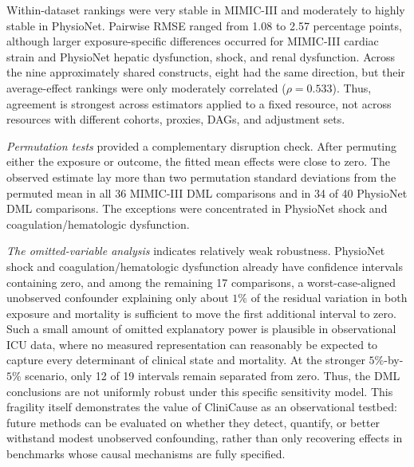 \documentclass[letterpaper]{article}
\begin{document}
Within-dataset rankings were very stable in MIMIC-III and moderately to highly
stable in PhysioNet. Pairwise RMSE ranged from 1.08 to 2.57 percentage points,
although larger exposure-specific differences occurred for MIMIC-III cardiac
strain and PhysioNet hepatic dysfunction, shock, and renal dysfunction. Across
the nine approximately shared constructs, eight had the same direction, but
their average-effect rankings were only moderately correlated
(\(\rho=0.533\)). Thus, agreement is strongest across estimators applied to a
fixed resource, not across resources with different cohorts, proxies, DAGs, and
adjustment sets.

\emph{Permutation tests} provided a complementary disruption check. After permuting
either the exposure or outcome, the fitted mean effects were close to zero. The
observed estimate lay more than two permutation standard deviations from the
permuted mean in all 36 MIMIC-III DML comparisons and in 34 of 40 PhysioNet DML
comparisons. The exceptions were concentrated in PhysioNet shock and
coagulation/hematologic dysfunction.

\emph{The omitted-variable analysis} indicates relatively weak robustness. PhysioNet
shock and coagulation/hematologic dysfunction already have confidence intervals
containing zero, and among the remaining 17 comparisons, a worst-case-aligned
unobserved confounder explaining only about \(1\%\) of the residual variation in
both exposure and mortality is sufficient to move the first additional interval
to zero. Such a small amount of omitted explanatory power is plausible in
observational ICU data, where no measured representation can reasonably be
expected to capture every determinant of clinical state and mortality. At the
stronger \(5\%\)-by-\(5\%\) scenario, only 12 of 19 intervals remain separated
from zero. Thus, the DML conclusions are not uniformly robust under this
specific sensitivity model. This fragility itself demonstrates the value of
CliniCause as an observational testbed: future methods can be evaluated on
whether they detect, quantify, or better withstand modest unobserved
confounding, rather than only recovering effects in benchmarks whose causal
mechanisms are fully specified.


\end{document}
